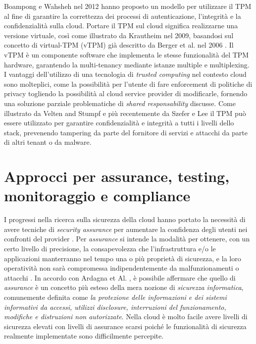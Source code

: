 \documentclass[../main.tex]{subfiles}
\begin{document}
Boampong e Wahsheh nel 2012 \cite{Boampong:2012:DFS:2331762.2331767} hanno proposto un modello per utilizzare il TPM al fine di garantire la correttezza dei processi di autenticazione, l'integrità e la confidenzialità sulla cloud.
Portare il TPM sul cloud significa realizzarne una versione virtuale, così come illustrato da Krautheim \cite{Krautheim:2009:PVI:1855533.1855538} nel 2009, basandosi sul concetto di virtual-TPM (vTPM) già descritto da Berger et al. nel 2006 \cite{Berger:2006:VVT:1267336.1267357}.
Il vTPM è un componente software che implementa le stesse funzionalità del TPM hardware, garantendo la multi-tenancy mediante istanze multiple e multiplexing.
I vantaggi dell'utilizzo di una tecnologia di \textit{trusted computing} nel contesto cloud sono molteplici, come la possibilità per l'utente di fare enforcement di politiche di privacy togliendo la possibilità al cloud service provider di modificarle, fornendo una soluzione parziale problematiche di \textit{shared responsability} discusse. 
Come illustrato da Velten and Stumpf \cite{Velten2013} e più recentemente da Szefer e Lee \cite{SzeferLee} il TPM può essere utilizzato per garantire confidenzialità e integrità a tutti i livelli dello stack, prevenendo tampering da parte del fornitore di servizi e attacchi da parte di altri tenant o da malware.


\section{Approcci per assurance, testing, monitoraggio e compliance}
I progressi nella ricerca sulla sicurezza della cloud hanno portato la necessità di avere tecniche di \textit{security assurance} per aumentare la confidenza degli utenti nei confronti del provider \cite{6814039}.
Per \textit{assurance} si intende la modalità per ottenere, con un certo livello di precisione, la consapevolezza che l'infrastruttura e/o le applicazioni manterranno nel tempo una o più proprietà di sicurezza, e la loro operatività non sarà compromessa indipendentemente da malfunzionamenti o attacchi \cite{goertzel2007software}.
In accordo con Ardagna et Al. \cite{Ardagna:2015:SAC:2808687.2767005}, è possibile affermare che quello di \textit{assurance} è un concetto più esteso della mera nozione di \textit{sicurezza informatica}, comunemente definita come \textit{la protezione delle informazioni e dei sistemi informativi da accessi, utilizzi disclosure, interruzioni del funzionamento, modifiche e distruzioni non autorizzate}.
Nella cloud è molto facile avere livelli di sicurezza elevati con livelli di assurance scarsi poiché le funzionalità di sicurezza realmente implementate sono difficilmente percepite. 
\end{document}
